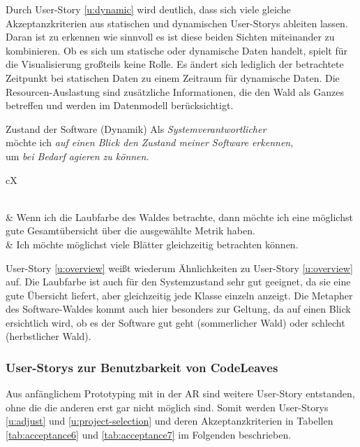 Durch User-Story \ref{u:dynamic} wird deutlich, dass sich viele gleiche Akzeptanzkriterien aus statischen und dynamischen User-Storys ableiten lassen. Daran ist zu erkennen wie sinnvoll es ist diese beiden Sichten miteinander zu kombinieren. Ob es sich um statische oder dynamische Daten handelt, spielt für die Visualisierung großteils keine Rolle. Es ändert sich lediglich der betrachtete Zeitpunkt bei statischen Daten zu einem Zeitraum für dynamische Daten. Die Resourcen-Auslastung sind zusätzliche Informationen, die den Wald als Ganzes betreffen und werden im Datenmodell berücksichtigt.

\begin{userstory}[u:overview]{Zustand der Software (Dynamik)}
  Als \textit{Systemverantwortlicher}\\
  möchte ich \textit{auf einen Blick den Zustand meiner Software erkennen},\\
  um \textit{bei Bedarf agieren zu können}.
\end{userstory}

\setaccid
\begin{tabularx}{\textwidth}{cX}
	\caption{Akzeptanzkriterien zu User-Story \ref{u:overview}} \label{tab:acceptance5}\\
     & Wenn ich die Laubfarbe des Waldes betrachte, dann möchte ich eine möglichst gute Gesamtübersicht über die ausgewählte Metrik haben.\\
     & Ich möchte möglichst viele Blätter gleichzeitig betrachten können.\\
\end{tabularx}

User-Story \ref{u:overview} weißt wiederum Ähnlichkeiten zu User-Story \ref{u:overview} auf. Die Laubfarbe ist auch für den Systemzustand sehr gut geeignet, da sie eine gute Übersicht liefert, aber gleichzeitig jede Klasse einzeln anzeigt. Die Metapher des Software-Waldes kommt auch hier besonders zur Geltung, da auf einen Blick ersichtlich wird, ob es der Software gut geht (sommerlicher Wald) oder schlecht (herbstlicher Wald).

\subsubsection*{User-Storys zur Benutzbarkeit von CodeLeaves}

Aus anfänglichem Prototyping mit in der AR sind weitere User-Story entstanden, ohne die die anderen erst gar nicht möglich sind. Somit werden User-Storys \ref{u:adjust} und \ref{u:project-selection} und deren Akzeptanzkriterien in Tabellen \ref{tab:acceptance6} und \ref{tab:acceptance7} im Folgenden beschrieben.

